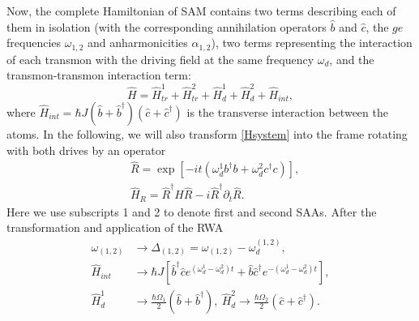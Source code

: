 \documentclass[%
 pra,
 amsmath,amssymb,
 reprint,%
]{revtex4-1}
\begin{document}
Now, the complete Hamiltonian of SAM contains two terms describing each of them in isolation (with the corresponding annihilation operators $\hat b$ and $\hat c$, the $ge$ frequencies $\omega_{1,2}$ and anharmonicities $\alpha_{1,2}$), two terms representing the interaction of each transmon with the driving field at the same frequency $\omega_d$, and the transmon-transmon interaction term:
\begin{equation}\label{Hsystem}
\hat H = \hat H_{tr}^{1}+\hat H_{tr}^{2}+\hat H_{d}^1+\hat H_{d}^2+\hat H_{int},
\end{equation}
where $\hat H_{int} = \hbar J (\hat b +\hat b^\dag)(\hat c+\hat c^{\dagger})$ is the transverse interaction between the atoms. In the following, we will also transform \eqref{Hsystem} into the frame rotating with both drives by an operator
\begin{align}
&\hat R = \exp[-i t (\omega_d^1 b^{\dagger}b+\omega_d^2 c^{\dagger}c)],\label{eq:R}\\
&\hat H_R = \hat R^{\dagger}\hat H \hat R -	 {i}\hat R^{\dagger}\partial_t \hat R.\label{eq:rotation}
\end{align}
Here we use subscripts 1 and 2 to denote first and second SAAs. After the transformation and application of the RWA
\begin{equation}
\begin{aligned}
	\omega_{(1,2)} &\rightarrow \Delta_{(1,2)} = \omega_{(1,2)} - \omega_d^{(1,2)},\\
	\hat H_{int} &\rightarrow \hbar J \left[\hat b^\dag \hat c e^{(\omega_d^1 - \omega_d^2)t} + \hat b \hat c^\dag e^{-(\omega_d^1 - \omega_d^2)t}\right],\\
	\hat H_{d}^1 &\rightarrow \frac{\hbar \Omega_1}{2}(\hat b  + \hat b^\dag),\ 	\hat H_{d}^2 \rightarrow \frac{\hbar \Omega_2}{2}(\hat c  + \hat c^\dag).
\end{aligned}
\label{eq:RWA}
\end{equation}
\end{document}
